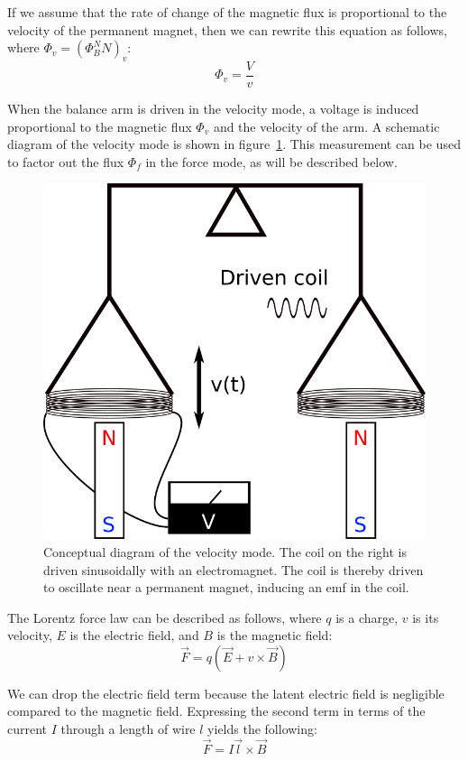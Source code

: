\documentclass[aps,prstab,reprint,12pt]{revtex4-1}
\begin{document}
If we assume that the rate of change of the magnetic flux is proportional to the velocity of the permanent magnet, then we can rewrite this equation as follows, where $\Phi_v = (\Phi_B^NN)_v$:
\begin{equation}\label{eq:velocity_equation}
    \Phi_v  = \frac{V}{v}
\end{equation}

When the balance arm is driven in the velocity mode, a voltage is induced proportional to the magnetic flux $\Phi_v$ and the velocity of the arm. A schematic diagram of the velocity mode is shown in figure~\ref{fig:vmode-concept}. This measurement can be used to factor out the flux $\Phi_f$ in the force mode, as will be described below.

\begin{figure}[b]
    \centering
    \includegraphics[width=0.6\linewidth]{figs/watt-balance-vmode.png}
    \caption{Conceptual diagram of the velocity mode. The coil on the right is driven sinusoidally with an electromagnet. The coil is thereby driven to oscillate near a permanent magnet, inducing an emf in the coil.}
    \label{fig:vmode-concept}
\end{figure}

The Lorentz force law can be described as follows, where $q$ is a charge, $v$ is its velocity, $E$ is the electric field, and $B$ is the magnetic field:
\begin{equation}
    \vec{F} = q(\vec{E}+v\times \vec{B})
\end{equation}

We can drop the electric field term because the latent electric field is negligible compared to the magnetic field. Expressing the second term in terms of the current $I$ through a length of wire $l$ yields the following:
\begin{equation}
    \vec{F} = I \vec{l}\times \vec{B}
\end{equation}
\end{document}
